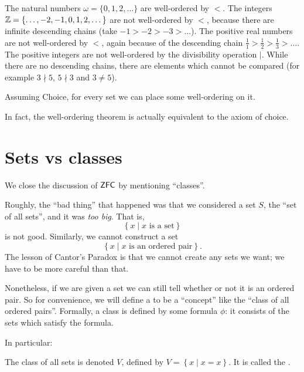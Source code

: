 \begin{example}
	\listhack
	\begin{enumerate}[(a)]
		\ii The natural numbers $\omega = \{0,1,2,\dots\}$
		are well-ordered by $<$.
		\ii The integers $\mathbb Z = \{\dots,-2,-1,0,1,2,\dots\}$ are not well-ordered by $<$,
		because there are infinite descending chains (take $-1 > -2 > -3 > \dots$).
		\ii The positive real numbers are not well-ordered by $<$,
		again because of the descending chain $\frac11>\frac12>\frac13>\dots$.
		\ii The positive integers are not well-ordered by the divisibility operation $\mid$.
		While there are no descending chains, there are elements which cannot be compared
		(for example $3 \nmid 5$, $5 \nmid 3$ and $3 \neq 5$).
	\end{enumerate}
\end{example}

\begin{theorem}
	Assuming Choice, for every set we can place some well-ordering on it.
\end{theorem}
In fact, the well-ordering theorem is actually equivalent to the axiom of choice.

\section{Sets vs classes}
We close the discussion of $\mathsf{ZFC}$ by mentioning ``classes''.

Roughly, the ``bad thing'' that happened was that we considered a set $S$, the
``set of all sets'', and it was \emph{too big}.
That is,
\[ \left\{ x \mid x \text{ is a set} \right\} \]
is not good.
Similarly, we cannot construct a set
\[ \left\{ x \mid x \text{ is an ordered pair} \right\}. \]
The lesson of Cantor's Paradox is that we cannot create any sets we want;
we have to be more careful than that.

Nonetheless, if we are given a set
we can still tell whether or not it is an ordered pair.
So for convenience, we will define a  to be
a ``concept'' like the ``class of all ordered pairs''.
Formally, a class is defined by some formula $\phi$:
it consists of the sets which satisfy the formula.

In particular:
\begin{definition}
	The class of all sets is denoted $V$, defined by $V = \left\{ x \mid x=x \right\}$.
	It is called the .
\end{definition}

